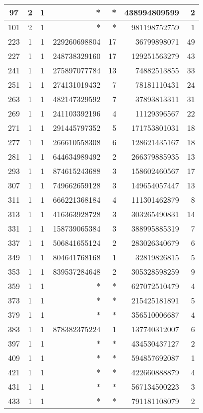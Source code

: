 \documentclass{mcom-l}
\theoremstyle{definition}
\begin{document}
\begin{longtable}[b]{| c | c | c || r | r | r | r |}
\hline
97	& 2	& 1	& *	& *	& 438994809599	& 2\\
\hline
101	& 2	& 1	& *	& *	& 981198752759	& 1\\
\hline
223	& 1	& 1	& 229260698804	& 17	& 36799898071	& 49\\
\hline
227	& 1	& 1	& 248738329160	& 17	& 129251563279	& 43\\
\hline
241	& 1	& 1	& 275897077784	& 13	& 74882513855	& 33\\
\hline
251	& 1	& 1	& 274131019432	& 7	& 78181110431	& 24\\
\hline
263	& 1	& 1	& 482147329592	& 7	& 37893813311	& 31\\
\hline
269	& 1	& 1	& 241103392196	& 4	& 11129396567	& 22\\
\hline
271	& 1	& 1	& 291445797352	& 5	& 171753801031	& 18\\
\hline
277	& 1	& 1	& 266610558308	& 6	& 128621435167	& 18\\
\hline
281	& 1	& 1	& 644634989492	& 2	& 266379885935	& 13\\
\hline
293	& 1	& 1	& 874615243688	& 3	& 158602460567	& 17\\
\hline
307	& 1	& 1	& 749662659128	& 3	& 149654057447	& 13\\
\hline
311	& 1	& 1	& 666221368184	& 4	& 111301462879	& 8\\
\hline
313	& 1	& 1	& 416363928728	& 3	& 303265490831	& 14\\
\hline
331	& 1	& 1	& 158739065384	& 3	& 388995885319	& 7\\
\hline
337	& 1	& 1	& 506841655124	& 2	& 283026340679	& 6\\
\hline
349	& 1	& 1	& 804641768168	& 1	& 32819826815	& 5\\
\hline
353	& 1	& 1	& 839537284648	& 2	& 305328598259	& 9\\
\hline
359	& 1	& 1	& *	& *	& 627072510479	& 4\\
\hline
373	& 1	& 1	& *	& *	& 215425181891	& 5\\
\hline
379	& 1	& 1	& *	& *	& 356510006687	& 4\\
\hline
383	& 1	& 1	& 878382375224	& 1	& 137740312007	& 6\\
\hline
397	& 1	& 1	& *	& *	& 434530437127	& 2\\
\hline
409	& 1	& 1	& *	& *	& 594857692087	& 1\\
\hline
421	& 1	& 1	& *	& *	& 422660888879	& 4\\
\hline
431	& 1	& 1	& *	& *	& 567134500223	& 3\\
\hline
433	& 1	& 1	& *	& *	& 791181108079	& 2\\

\end{longtable}
\end{document}
